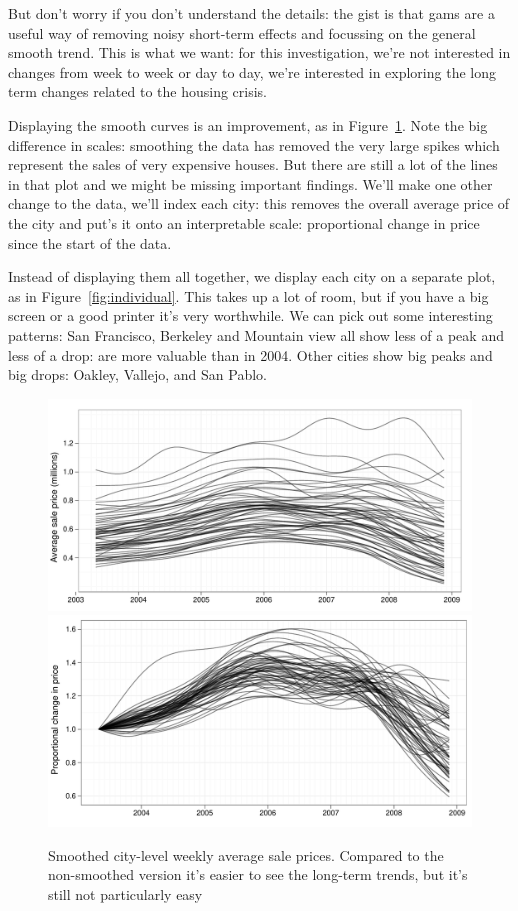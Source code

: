 \documentclass[oneside]{article}
\begin{document}
But don't worry if you don't understand the details: the gist is that {\sc gam}s are a useful way of removing noisy short-term effects and focussing on the general smooth trend.  This is what we want: for this investigation, we're not interested in changes from week to week or day to day, we're interested in exploring the long term changes related to the housing crisis.

Displaying the smooth curves is an improvement, as in Figure~\ref{fig:smoothed}.  Note the big difference in scales: smoothing the data has removed the very large spikes which represent the sales of very expensive houses.  But there are still a lot of the lines in that plot and we might be missing important findings.  We'll make one other change to the data, we'll index each city: this removes the overall average price of the city and put's it onto an interpretable scale: proportional change in price since the start of the data.  

Instead of displaying them all together, we display each city on a separate plot, as in Figure~\ref{fig:individual}.  This takes up a lot of room, but if you have a big screen or a good printer it's very worthwhile.  We can pick out some interesting patterns: San Francisco, Berkeley and Mountain view all show less of a peak and less of a drop: are more valuable than in 2004.  Other cities show big peaks and big drops: Oakley, Vallejo, and San Pablo.

\begin{figure}[htbp]
  \centering
  \includegraphics[width=0.5 \linewidth]{cities-smooth}%
  \includegraphics[width=0.5 \linewidth]{cities-indexed}
  \caption{Smoothed city-level weekly average sale prices.  Compared to the non-smoothed version it's easier to see the long-term trends, but it's still not particularly easy}
  \label{fig:smoothed}
\end{figure}
\end{document}
